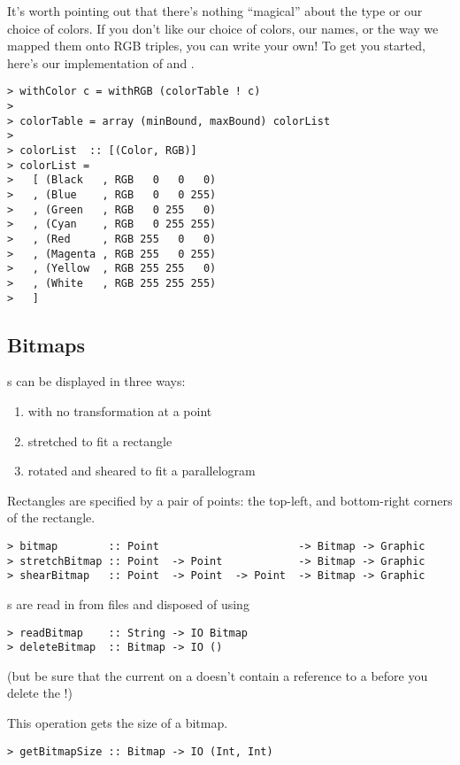 It's worth pointing out that there's nothing ``magical'' about the
 type or our choice of colors.  If you don't like our
choice of colors, our names, or the way we mapped them onto RGB
triples, you can write your own!  To get you started, here's our
implementation of  and .

\begin{verbatim}
> withColor c = withRGB (colorTable ! c)
> 
> colorTable = array (minBound, maxBound) colorList
> 
> colorList  :: [(Color, RGB)]
> colorList =
>   [ (Black   , RGB   0   0   0)
>   , (Blue    , RGB   0   0 255)
>   , (Green   , RGB   0 255   0)
>   , (Cyan    , RGB   0 255 255)
>   , (Red     , RGB 255   0   0)
>   , (Magenta , RGB 255   0 255)
>   , (Yellow  , RGB 255 255   0)
>   , (White   , RGB 255 255 255)
>   ]
\end{verbatim}

\subsection{Bitmaps}

s can be displayed in three ways:

\begin{enumerate}
\item with no transformation at  a point
\item stretched to fit           a rectangle
\item rotated and sheared to fit a parallelogram
\end{enumerate}

Rectangles are specified by a pair of points: the top-left, and
bottom-right corners of the rectangle.

\begin{verbatim}
> bitmap        :: Point                      -> Bitmap -> Graphic
> stretchBitmap :: Point  -> Point            -> Bitmap -> Graphic
> shearBitmap   :: Point  -> Point  -> Point  -> Bitmap -> Graphic
\end{verbatim}

s are read in from files and disposed of using 
\begin{verbatim}
> readBitmap    :: String -> IO Bitmap
> deleteBitmap  :: Bitmap -> IO ()
\end{verbatim}
(but be sure that the current  on a 
doesn't contain a reference to a  before you delete the
!)

This operation gets the size of a bitmap.
\begin{verbatim}
> getBitmapSize :: Bitmap -> IO (Int, Int)
\end{verbatim}

